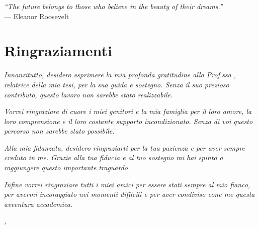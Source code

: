 \cleardoublepage{}

\begin{flushright}{
    \slshape
    ``The future belongs to those who believe in the beauty of their dreams.''} \\
    \medskip
    --- Eleanor Roosevelt
\end{flushright}


\bigskip

\begingroup
\let\clearpage\relax
\let\cleardoublepage\relax
\let\cleardoublepage\relax

\chapter*{Ringraziamenti}

\noindent \textit{Innanzitutto, desidero esprimere la mia profonda gratitudine alla Prof.ssa \myProf, relatrice della mia tesi, per la sua guida e sostegno. Senza il suo prezioso contributo, questo lavoro non sarebbe stato realizzabile.\\}

\noindent \textit{Vorrei ringraziare di cuore i miei genitori e la mia famiglia per il loro amore, la loro comprensione e il loro costante supporto incondizionato. Senza di voi questo percorso non sarebbe stato possibile.\\}

\noindent \textit{Alla mia fidanzata, desidero ringraziarti per la tua pazienza e per aver sempre creduto in me. Grazie alla tua fiducia e al tuo sostegno mi hai spinto a raggiungere questo importante traguardo. \\}

\noindent \textit{Infine vorrei ringraziare tutti i miei amici per essere stati sempre al mio fianco, per avermi incoraggiato nei momenti difficili e per aver condiviso cone me questa avventura accademica.\\}



\bigskip

\noindent\textit{\myLocation, \myTime}
\hfill \myName\endgroup

